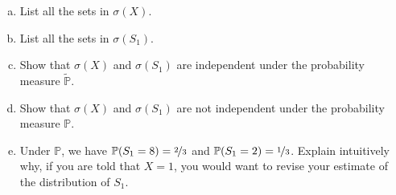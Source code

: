 \documentclass[11pt]{article}
\renewcommand\P{\mathbb{P}} %
\newcounter{question}[section]
\begin{document}
\begin{hwquestion}
        \begin{enumerate}[(a), nolistsep]
            \item List all the sets in $\sigma(X)$.
            \item List all the sets in $\sigma(S_1)$.
            \item Show that $\sigma(X)$ and $\sigma(S_1)$ are independent under the
            probability measure $\widetilde{\P}$.
            \item Show that $\sigma(X)$ and $\sigma(S_1)$ are not independent under the
            probability measure $\P$.
            \item Under $\P$, we have $\P(S_1 = 8) = \nicefrac{2}{3}$ and $\P(S_1 = 2) =
            \nicefrac{1}{3}$. Explain intuitively why, if you are told that $X = 1$, you
            would want to revise your estimate of the distribution of $S_1$.
        \end{enumerate}
    \end{hwquestion}
\end{document}
